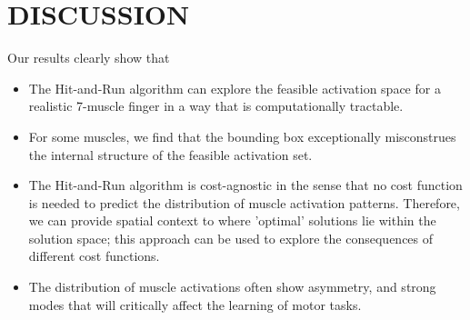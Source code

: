 \section{DISCUSSION}

Our results clearly show that\\
\begin{itemize}
  \item The Hit-and-Run algorithm can explore the feasible activation space for a realistic 7-muscle finger in a way that is computationally tractable.
  \item For some muscles, we find that the bounding box exceptionally misconstrues the internal structure of the feasible activation set.
  \item The Hit-and-Run algorithm is cost-agnostic in the sense that no cost function is needed to predict the distribution of muscle activation patterns. Therefore, we can provide spatial context to where 'optimal' solutions lie within the solution space; this approach can be used to explore the consequences of different cost functions.
  \item The distribution of muscle activations often show asymmetry, and strong modes that will critically affect the learning of motor tasks.
\end{itemize}


